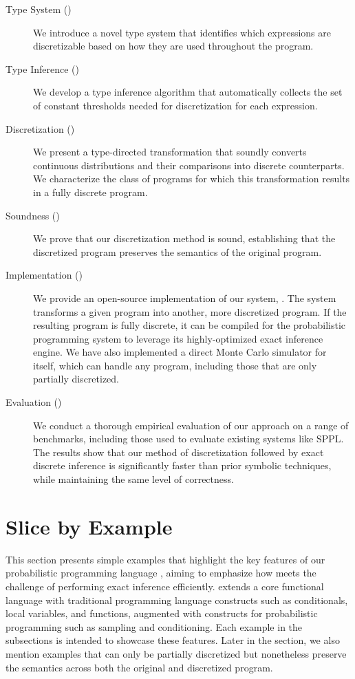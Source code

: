 \documentclass[acmsmall,screen,dvipsnames,x11names,nonacm,anonymous,review]{acmart}
\newcommand{\Slice}{\text{\scshape Slice}\xspace}
\newcommand{\Dice}{\text{\scshape Dice}\xspace}
\begin{document}
\begin{description}
    \item[Type System ()] We introduce a novel type system that identifies which expressions are discretizable based on how they are used throughout the program.

    \item[Type Inference ()] We develop a type inference algorithm that automatically collects the set of constant thresholds needed for discretization for each expression.

    \item[Discretization ()] We present a type-directed transformation that soundly converts continuous distributions and their comparisons into discrete counterparts. We characterize the class of programs for which this transformation results in a fully discrete program.

    \item[Soundness ()] We prove that our discretization method is sound, establishing that the discretized program preserves the semantics of the original program.

    \item[Implementation ()] We provide an open-source implementation of our system, \Slice. The system transforms a given \Slice program into another, more discretized \Slice program. If the resulting program is fully discrete, it can be compiled for the \Dice probabilistic programming system to leverage its highly-optimized exact inference engine. We have also implemented a direct Monte Carlo simulator for \Slice itself, which can handle any program, including those that are only partially discretized.

    \item[Evaluation ()] We conduct a thorough empirical evaluation of our approach on a range of benchmarks, including those used to evaluate existing systems like SPPL. The results show that our method of discretization followed by exact discrete inference is significantly faster than prior symbolic techniques, while maintaining the same level of correctness.
\end{description}

\section{Slice by Example}\label{sec:examples}
This section presents simple examples that highlight the key features of our probabilistic programming language \Slice, aiming to emphasize how \Slice meets the challenge of performing exact inference efficiently. \Slice extends a core functional language with traditional programming language constructs such as conditionals, local variables, and functions, augmented with constructs for probabilistic programming such as sampling and conditioning. Each example in the subsections is intended to showcase these features. Later in the section, we also mention examples that can only be partially discretized but nonetheless preserve the semantics across both the original and discretized program.
\end{document}
